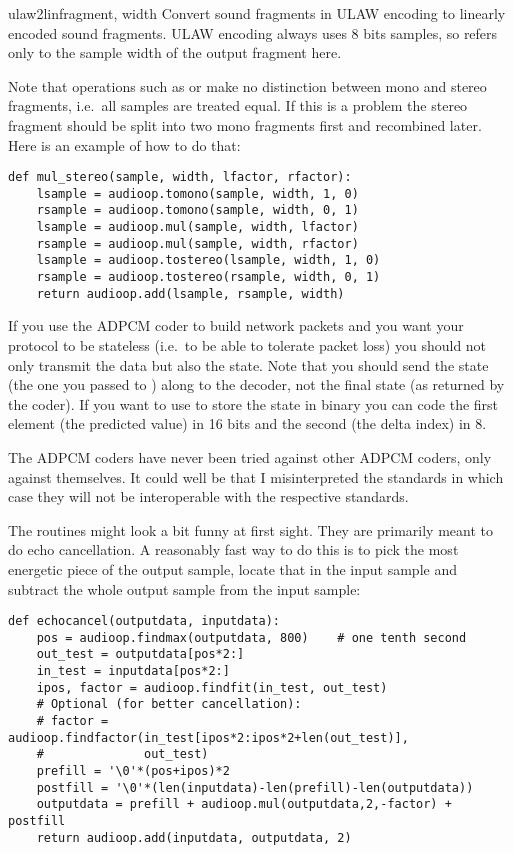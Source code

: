 \begin{funcdesc}{ulaw2lin}{fragment, width}
Convert sound fragments in ULAW encoding to linearly encoded sound
fragments.  ULAW encoding always uses 8 bits samples, so 
refers only to the sample width of the output fragment here.
\end{funcdesc}

Note that operations such as  or  make no
distinction between mono and stereo fragments, i.e.\ all samples are
treated equal.  If this is a problem the stereo fragment should be split
into two mono fragments first and recombined later.  Here is an example
of how to do that:
\begin{verbatim}
def mul_stereo(sample, width, lfactor, rfactor):
    lsample = audioop.tomono(sample, width, 1, 0)
    rsample = audioop.tomono(sample, width, 0, 1)
    lsample = audioop.mul(sample, width, lfactor)
    rsample = audioop.mul(sample, width, rfactor)
    lsample = audioop.tostereo(lsample, width, 1, 0)
    rsample = audioop.tostereo(rsample, width, 0, 1)
    return audioop.add(lsample, rsample, width)
\end{verbatim}
%
If you use the ADPCM coder to build network packets and you want your
protocol to be stateless (i.e.\ to be able to tolerate packet loss)
you should not only transmit the data but also the state.  Note that
you should send the  state (the one you passed to
) along to the decoder, not the final state (as returned by
the coder).  If you want to use  to store the state in
binary you can code the first element (the predicted value) in 16 bits
and the second (the delta index) in 8.

The ADPCM coders have never been tried against other ADPCM coders,
only against themselves.  It could well be that I misinterpreted the
standards in which case they will not be interoperable with the
respective standards.

The  routines might look a bit funny at first sight.
They are primarily meant to do echo cancellation.  A reasonably
fast way to do this is to pick the most energetic piece of the output
sample, locate that in the input sample and subtract the whole output
sample from the input sample:
\begin{verbatim}
def echocancel(outputdata, inputdata):
    pos = audioop.findmax(outputdata, 800)    # one tenth second
    out_test = outputdata[pos*2:]
    in_test = inputdata[pos*2:]
    ipos, factor = audioop.findfit(in_test, out_test)
    # Optional (for better cancellation):
    # factor = audioop.findfactor(in_test[ipos*2:ipos*2+len(out_test)], 
    #              out_test)
    prefill = '\0'*(pos+ipos)*2
    postfill = '\0'*(len(inputdata)-len(prefill)-len(outputdata))
    outputdata = prefill + audioop.mul(outputdata,2,-factor) + postfill
    return audioop.add(inputdata, outputdata, 2)
\end{verbatim}
